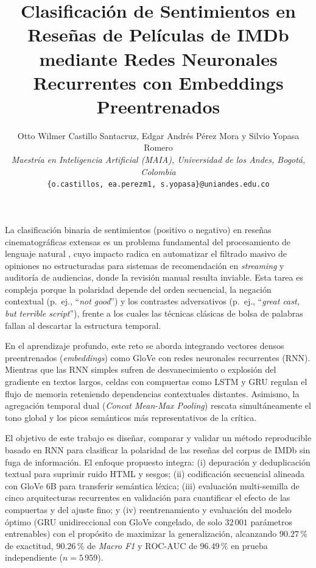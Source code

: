 \documentclass[letterpaper, 10 pt, conference]{ieeeconf}
\title{\LARGE \bf
Clasificación de Sentimientos en Reseñas de Películas de IMDb mediante Redes Neuronales Recurrentes con Embeddings Preentrenados
}
\author{Otto Wilmer Castillo Santacruz, Edgar Andrés Pérez Mora y Silvio Yopasa Romero\\
\textit{Maestría en Inteligencia Artificial (MAIA), Universidad de los Andes, Bogotá, Colombia}\\
{\tt\small \{o.castillos, ea.perezm1, s.yopasa\}@uniandes.edu.co}
}
\makeatletter
\def\section{\@startsection{section}{1}{\z@}{0.75ex plus 0.2ex minus 0.1ex}{0.20ex plus 0.10ex minus 0ex}{\normalfont\normalsize\centering\scshape}}
\makeatother
\begin{document}
\maketitle
\thispagestyle{empty}
\pagestyle{empty}

\section{Introducción}

La clasificación binaria de sentimientos (positivo o negativo) en reseñas cinematográficas extensas es un problema fundamental del procesamiento de lenguaje natural \cite{c3}, cuyo impacto radica en automatizar el filtrado masivo de opiniones no estructuradas para sistemas de recomendación en \textit{streaming} y auditoría de audiencias, donde la revisión manual resulta inviable. Esta tarea es compleja porque la polaridad depende del orden secuencial, la negación contextual (p.~ej., ``\textit{not good}'') y los contrastes adversativos (p.~ej., ``\textit{great cast, but terrible script}''), frente a los cuales las técnicas clásicas de bolsa de palabras fallan al descartar la estructura temporal.

En el aprendizaje profundo, este reto se aborda integrando vectores densos preentrenados (\textit{embeddings}) como GloVe \cite{c4} con redes neuronales recurrentes (RNN). Mientras que las RNN simples sufren de desvanecimiento o explosión del gradiente en textos largos, celdas con compuertas como LSTM \cite{c1} y GRU \cite{c2} regulan el flujo de memoria reteniendo dependencias contextuales distantes. Asimismo, la agregación temporal dual (\textit{Concat Mean-Max Pooling}) \cite{c5} rescata simultáneamente el tono global y los picos semánticos más representativos de la crítica.

El objetivo de este trabajo es diseñar, comparar y validar un método reproducible basado en RNN para clasificar la polaridad de las reseñas del corpus de IMDb \cite{c3} sin fuga de información. El enfoque propuesto integra: (i) depuración y deduplicación textual para suprimir ruido HTML y sesgos; (ii) codificación secuencial alineada con GloVe 6B \cite{c4} para transferir semántica léxica; (iii) evaluación multi-semilla de cinco arquitecturas recurrentes en validación para cuantificar el efecto de las compuertas y del ajuste fino; y (iv) reentrenamiento y evaluación del modelo óptimo (GRU unidireccional con GloVe congelado, de solo $32\,001$ parámetros entrenables) con el propósito de maximizar la generalización, alcanzando $90.27\,\%$ de exactitud, $90.26\,\%$ de \textit{Macro F1} y $\text{ROC-AUC}$ de $96.49\,\%$ en prueba independiente ($n=5\,959$).
\end{document}
